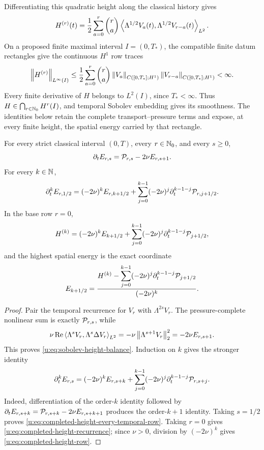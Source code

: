 Differentiating this quadratic height along the classical history gives
\[
 H^{(r)}(t)=\frac12\sum_{a=0}^r\binom ra
 \left\langle \Lambda^{1/2}V_a(t),\Lambda^{1/2}V_{r-a}(t)\right\rangle_{L^2}.
\]
On a proposed finite maximal interval \(I=(0,T_*)\), the compatible finite
datum rectangles give the continuous \(H^1\) row traces
\[
 \left\lVert H^{(r)}\right\rVert_{L^\infty(I)}
 \le\frac12\sum_{a=0}^r\binom ra
 \left\lVert V_a\right\rVert_{C([0,T_*];H^1)}
 \left\lVert V_{r-a}\right\rVert_{C([0,T_*];H^1)}<\infty.
\]
Every finite derivative of \(H\) belongs to \(L^2(I)\), since
\(T_*<\infty\). Thus \(H\in\bigcap_{r\in\mathbb N_0}H^r(I)\), and
temporal Sobolev embedding gives its smoothness.  The identities below retain
the complete transport--pressure terms and expose, at every finite height, the
spatial energy carried by that rectangle.

\begin{proposition}
\label{u:prop:completed-height-recurrence}
For every strict classical interval \((0,T)\), every \(r\in\mathbb N_0\), and
every \(s\ge0\),
\begin{equation}
 \partial_tE_{r,s}=\mathcal P_{r,s}-2\nu E_{r,s+1}.
 \label{u:eq:sobolev-height-balance}
\end{equation}
For every \(k\in\mathbb N\),
\begin{equation}
 \partial_t^kE_{r,1/2}
 =(-2\nu)^kE_{r,k+1/2}
 +\sum_{j=0}^{k-1}(-2\nu)^j
   \partial_t^{k-1-j}\mathcal P_{r,j+1/2}.
 \label{u:eq:completed-height-every-temporal-row}
\end{equation}
In the base row \(r=0\),
\begin{equation}
 H^{(k)}
 =(-2\nu)^kE_{k+1/2}
 +\sum_{j=0}^{k-1}(-2\nu)^j
   \partial_t^{k-1-j}\mathcal P_{j+1/2},
 \label{u:eq:completed-height-recurrence}
\end{equation}
and the highest spatial energy is the exact coordinate
\begin{equation}
 E_{k+1/2}
 =\frac{H^{(k)}-
   \displaystyle\sum_{j=0}^{k-1}(-2\nu)^j
   \partial_t^{k-1-j}\mathcal P_{j+1/2}}
 {(-2\nu)^k}.
 \label{u:eq:completed-height-row}
\end{equation}
\end{proposition}

\begin{proof}
Pair the temporal recurrence for \(V_r\) with \(\Lambda^{2s}V_r\).
The pressure-complete nonlinear sum is exactly \(\mathcal P_{r,s}\), while
\[
 \nu\operatorname{Re}\left\langle \Lambda^sV_r,\Lambda^s\Delta V_r\right\rangle_{L^2}
 =-\nu\left\lVert \Lambda^{s+1}V_r\right\rVert_2^2=-2\nu E_{r,s+1}.
\]
This proves \eqref{u:eq:sobolev-height-balance}.  Induction on \(k\) gives
the stronger identity
\begin{equation}
 \partial_t^kE_{r,s}
 =(-2\nu)^kE_{r,s+k}
 +\sum_{j=0}^{k-1}(-2\nu)^j
   \partial_t^{k-1-j}\mathcal P_{r,s+j}.
 \label{u:eq:all-height-recurrence}
\end{equation}
Indeed, differentiation of the order-\(k\) identity followed by
\(\partial_tE_{r,s+k}=\mathcal P_{r,s+k}-2\nu E_{r,s+k+1}\) produces the
order-\(k+1\) identity.  Taking \(s=1/2\) proves
\eqref{u:eq:completed-height-every-temporal-row}.  Taking \(r=0\) gives
\eqref{u:eq:completed-height-recurrence}; since \(\nu>0\), division by
\((-2\nu)^k\) gives \eqref{u:eq:completed-height-row}.
\end{proof}

